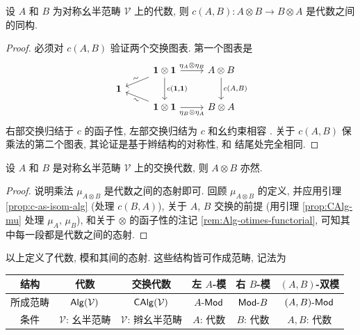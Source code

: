 \begin{lemma}\label{prop:c-as-isom-alg}
	设 $A$ 和 $B$ 为对称幺半范畴 $\mathcal{V}$ 上的代数, 则 $c(A, B): A \otimes B \to B \otimes A$ 是代数之间的同构.
\end{lemma}
\begin{proof}
	必须对 $c(A, B)$ 验证两个交换图表. 第一个图表是
	\[\begin{tikzcd}[row sep=tiny]
		& \munit \otimes \munit \arrow[ld, "\sim" sloped] \arrow[dd, "{c(\munit, \munit)}"] \arrow[r, "{\eta_A \otimes \eta_B}"] & A \otimes B \arrow[dd, "{c(A, B)}"] \\
		\munit & & \\
		& \munit \otimes \munit \arrow[lu, "\sim"' sloped] \arrow[r, "{\eta_B \otimes \eta_A}"'] & B \otimes A
	\end{tikzcd}\]
	右部交换归结于 $c$ 的函子性, 左部交换归结为 $c$ 和幺约束相容 \cite[(3.12)]{Li1}. 关于 $c(A, B)$ 保乘法的第二个图表, 其论证是基于辫结构的对称性, 和 \cite[\S 7.4]{Li1} 结尾处完全相同.
\end{proof}

\begin{proposition}
	设 $A$ 和 $B$ 是对称幺半范畴 $\mathcal{V}$ 上的交换代数, 则 $A \otimes B$ 亦然.
\end{proposition}
\begin{proof}
	说明乘法 $\mu_{A \otimes B}$ 是代数之间的态射即可. 回顾 $\mu_{A \otimes B}$ 的定义, 并应用引理 \ref{prop:c-as-isom-alg} (处理 $c(B, A)$), 关于 $A$, $B$ 交换的前提 (用引理 \ref{prop:CAlg-mu} 处理 $\mu_A$, $\mu_B$), 和关于 $\otimes$ 的函子性的注记 \ref{rem:Alg-otimes-functorial}, 可知其中每一段都是代数之间的态射.
\end{proof}

以上定义了代数, 模和其间的态射. 这些结构皆可作成范畴, 记法为
\begin{center}\begin{tabular}{|c|c|c|c|c|c|} \hline
	结构 & 代数 & 交换代数 & 左 $A$-模 & 右 $B$-模 & $(A,B)$-双模 \\ \hline
	所成范畴 & $\mathsf{Alg}(\mathcal{V})$ & $\mathsf{CAlg}(\mathcal{V})$ & $A\text{-}\mathsf{Mod}$ & $\mathsf{Mod}\text{-}B$ & $(A,B)\text{-}\mathsf{Mod}$ \\ \hline
	条件 & {\small $\mathcal{V}$: 幺半范畴} & {\small $\mathcal{V}$: 辫幺半范畴} & {\small $A$: 代数} & {\small $B$: 代数} & {\small $A, B$: 代数} \\ \hline
\end{tabular}\end{center}

